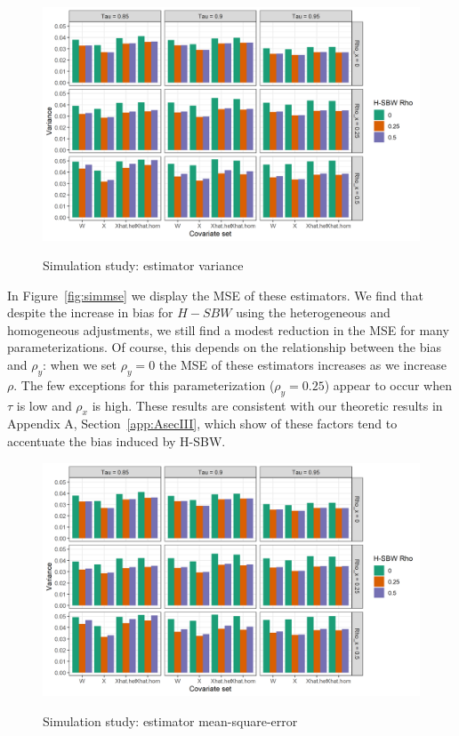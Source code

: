 \begin{figure}[H]
\begin{center}
    \caption{Simulation study: estimator variance}\label{fig:simvar}
    \label{fig:loveplotc1}
    \includegraphics[scale=0.5]{01_Plots/var-plot.png}
\end{center}
\end{figure}

In Figure~\ref{fig:simmse} we display the MSE of these estimators. We find that despite the increase in bias for $H-SBW$ using the heterogeneous and homogeneous adjustments, we still find a modest reduction in the MSE for many parameterizations. Of course, this depends on the relationship between the bias and $\rho_y$: when we set $\rho_y = 0$ the MSE of these estimators increases as we increase $\rho$. The few exceptions for this parameterization ($\rho_y = 0.25$) appear to occur when $\tau$ is low and $\rho_x$ is high. These results are consistent with our theoretic results in Appendix A, Section~\ref{app:AsecIII}, which show of these factors tend to accentuate the bias induced by H-SBW.

\begin{figure}[H]
\begin{center}
    \caption{Simulation study: estimator mean-square-error}\label{fig:simmse}
    \label{fig:loveplotc1}
    \includegraphics[scale=0.5]{01_Plots/var-plot.png}
\end{center}
\end{figure}

